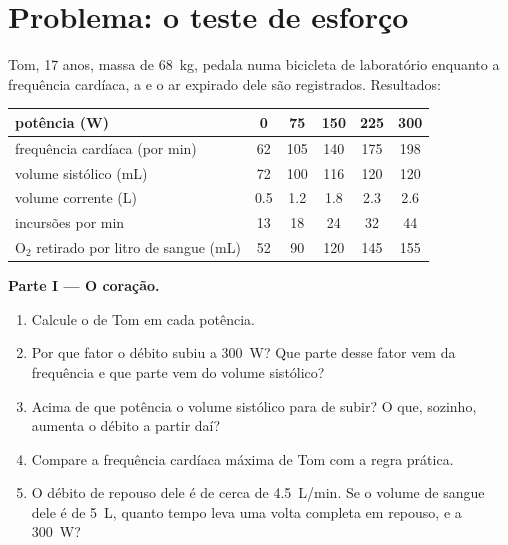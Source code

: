 \section{Problema: o teste de esforço}

\begin{problem}
\label{pb:g10:heart-lungs-effort:1}
Tom, 17 anos, massa de \qty{68}{kg}, pedala numa bicicleta de
laboratório enquanto a frequência cardíaca, a  e o ar
expirado dele são registrados. Resultados:

\begin{center}
\begin{tabular}{lccccc}
potência (W) & 0 & 75 & 150 & 225 & 300 \\ \hline
frequência cardíaca (por min) & 62 & 105 & 140 & 175 & 198 \\
volume sistólico (mL) & 72 & 100 & 116 & 120 & 120 \\
volume corrente (L) & 0.5 & 1.2 & 1.8 & 2.3 & 2.6 \\
incursões por min & 13 & 18 & 24 & 32 & 44 \\
$\mathrm{O_2}$ retirado por litro de sangue (mL) & 52 & 90 & 120 & 145 & 155 \\
\end{tabular}
\end{center}

\medskip
\noindent\textbf{Parte I --- O coração.}
\begin{enumerate}
  \item Calcule o  de Tom em cada potência.
  \item Por que fator o débito subiu a \qty{300}{W}? Que parte desse
        fator vem da frequência e que parte vem do volume sistólico?
  \item Acima de que potência o volume sistólico para de subir? O que,
        sozinho, aumenta o débito a partir daí?
  \item Compare a frequência cardíaca máxima de Tom com a regra
        prática.
  \item O débito de repouso dele é de cerca de \qty{4.5}{L/min}. Se o
        volume de sangue dele é de \qty{5}{L}, quanto tempo leva uma
        volta completa em repouso, e a \qty{300}{W}?
\end{enumerate}


\end{problem}
